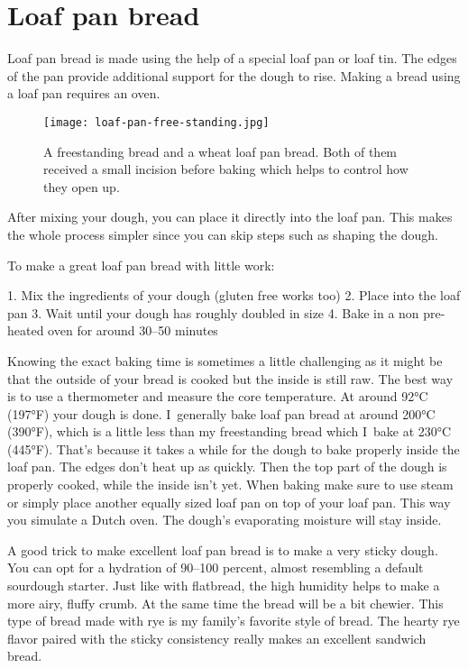 \section{Loaf pan bread}

Loaf pan bread is made using the help of a special loaf pan
or loaf tin. The edges of the pan provide additional support
for the dough to rise. Making a bread using a loaf pan requires
an oven.

\begin{figure}[!htb]
  \texttt{[image: loaf-pan-free-standing.jpg]}
  \caption{A freestanding bread and a wheat loaf pan bread. Both of them
  received a small incision before baking which helps to control how they open up.}%
  \label{fig:free-standing-loaf-pan}
\end{figure}

After mixing your dough, you can place it directly into the loaf pan.
This makes the whole process simpler since you can skip steps such
as shaping the dough.

To make a great loaf pan bread with little work:

1. Mix the ingredients of your dough (gluten free works too)
2. Place into the loaf pan
3. Wait until your dough has roughly doubled in size
4. Bake in a non pre-heated oven for around 30--50 minutes

Knowing the exact baking time is sometimes a little challenging
as it might be that the outside of your bread is cooked but
the inside is still raw. The best way is to use a thermometer
and measure the core temperature. At around 92°C (197°F) your
dough is done. I~generally bake loaf pan bread at around 200°C (390°F),
which is a little less than my freestanding bread which I~bake
at 230°C (445°F). That's because it takes a while for the dough
to bake properly inside the loaf pan. The edges don't heat up
as quickly. Then the top part of the dough is properly cooked, while
the inside isn't yet. When baking make sure to use steam
or simply place another equally sized loaf pan on top
of your loaf pan. This way you simulate a Dutch oven. The dough's
evaporating moisture will stay inside.

A good trick to make excellent loaf pan bread is to make a very
sticky dough. You can opt for a hydration of 90--100 percent, almost
resembling a default sourdough starter. Just like with flatbread,
the high humidity helps to make a more airy, fluffy crumb. At
the same time the bread will be a bit chewier. This
type of bread made with rye is my family's favorite style of bread.
The hearty rye flavor paired with the sticky consistency really
makes an excellent sandwich bread.

